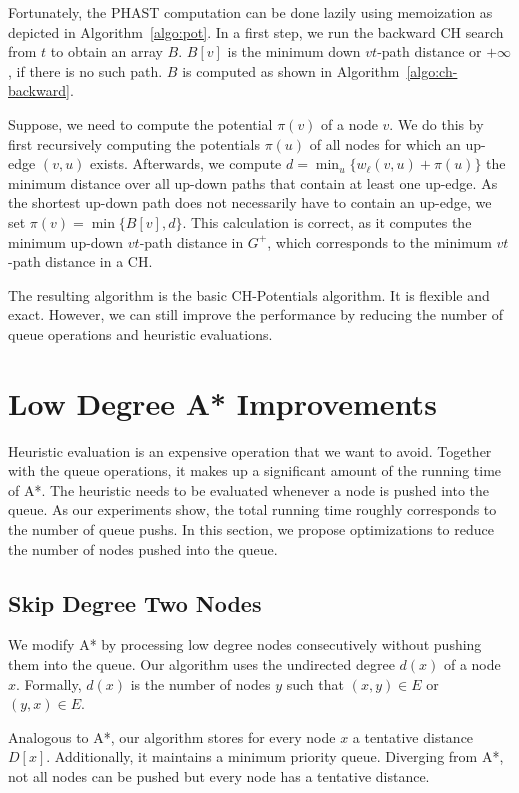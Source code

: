 \documentclass[letterpaper]{article} %
\begin{document}
Fortunately, the PHAST computation can be done lazily using memoization as depicted in Algorithm~\ref{algo:pot}.
In a first step, we run the backward CH search from $t$ to obtain an array $B$.
$B[v]$ is the minimum down $vt$-path distance or $+\infty$, if there is no such path.
$B$ is computed as shown in Algorithm~\ref{algo:ch-backward}.

Suppose, we need to compute the potential $\pi(v)$ of a node $v$.
We do this by first recursively computing the potentials $\pi(u)$ of all nodes for which an up-edge $(v,u)$ exists.
Afterwards, we compute $d = \min_u\{w_\ell(v,u) + \pi(u)\}$ the minimum distance over all up-down paths that contain at least one up-edge.
As the shortest up-down path does not necessarily have to contain an up-edge, we set $\pi(v) = \min \{ B[v], d \}$.
This calculation is correct, as it computes the minimum up-down $vt$-path distance in $G^+$, which corresponds to the minimum $vt$-path distance in a CH.

The resulting algorithm is the basic CH-Potentials algorithm.
It is flexible and exact.
However, we can still improve the performance by reducing the number of queue operations and heuristic evaluations.

\section{Low Degree A* Improvements}

\label{sec:low-deg-improvment}

Heuristic evaluation is an expensive operation that we want to avoid.
Together with the queue operations, it makes up a significant amount of the running time of A*.
The heuristic needs to be evaluated whenever a node is pushed into the queue.
As our experiments show, the total running time roughly corresponds to the number of queue pushs.
In this section, we propose optimizations to reduce the number of nodes pushed into the queue.

\subsection{Skip Degree Two Nodes}

We modify A* by processing low degree nodes consecutively without pushing them into the queue.
Our algorithm uses the undirected degree $d(x)$ of a node $x$.
Formally, $d(x)$ is the number of nodes $y$ such that $(x,y)\in E$ or $(y,x)\in E$.

Analogous to A*, our algorithm stores for every node $x$ a tentative distance $D[x]$.
Additionally, it maintains a minimum priority queue.
Diverging from A*, not all nodes can be pushed but every node has a tentative distance.
\end{document}
